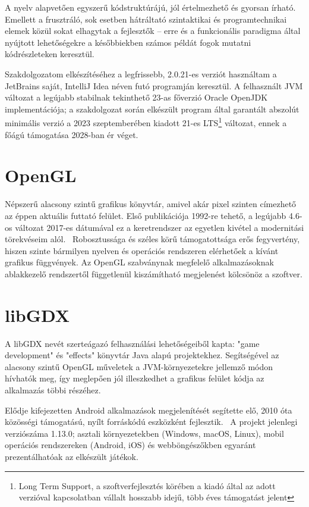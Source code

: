 A nyelv alapvetően egyszerű kódstruktúrájú, jól értelmezhető és gyorsan írható. Emellett a frusztráló, sok esetben hátráltató szintaktikai és programtechnikai elemek közül sokat elhagytak a fejlesztők -- erre és a funkcionális paradigma által nyújtott lehetőségekre a későbbiekben számos példát fogok mutatni kódrészleteken keresztül.

Szakdolgozatom elkészítéséhez a legfrissebb, 2.0.21-es verziót használtam a JetBrains saját, IntelliJ Idea néven futó programján keresztül. A felhasznált JVM változat a legújabb stabilnak tekinthető 23-as főverzió Oracle OpenJDK implementációja; a szakdolgozat során elkészült program által garantált abszolút minimális verzió a 2023 szeptemberében kiadott 21-es LTS\footnote{Long Term Support, a szoftverfejlesztés körében a kiadó által az adott verzióval kapcsolatban vállalt hosszabb idejű, több éves támogatást jelent} változat, ennek a főágú támogatása 2028-ban ér véget.~\cite{JavaRoadmap}

\section{OpenGL }

Népszerű alacsony szintű grafikus könyvtár, amivel akár pixel szinten címezhető az éppen aktuális futtató felület. Első publikációja 1992-re tehető, a legújabb 4.6-os változat 2017-es dátumával ez a keretrendszer az egyetlen kivétel a modernitási törekvéseim alól.~\cite{OpenglHistory} Robosztussága és széles körű támogatottsága erős fegyvertény, hiszen szinte bármilyen nyelven és operációs rendszeren elérhetőek a kívánt grafikus függvények. Az OpenGL szabványnak megfelelő alkalmazásoknak ablakkezelő rendszertől függetlenül kiszámítható megjelenést kölcsönöz a szoftver.

\section{libGDX }

A libGDX nevét szerteágazó felhasználási lehetőségeiből kapta: "game development" és "effects" könyvtár Java alapú projektekhez. Segítségével az alacsony szintű OpenGL műveletek a JVM-környezetekre jellemző módon hívhatók meg, így meglepően jól illeszkedhet a grafikus felület kódja az alkalmazás többi részéhez.

Elődje kifejezetten Android alkalmazások megjelenítését segítette elő, 2010 óta közösségi támogatású, nyílt forráskódú eszközként fejlesztik.~\cite{LibgdxHistory} A projekt jelenlegi verziószáma 1.13.0; asztali környezetekben (Windows, macOS, Linux), mobil operációs rendszereken (Android, iOS) és webböngészőkben egyaránt prezentálhatóak az elkészült játékok.